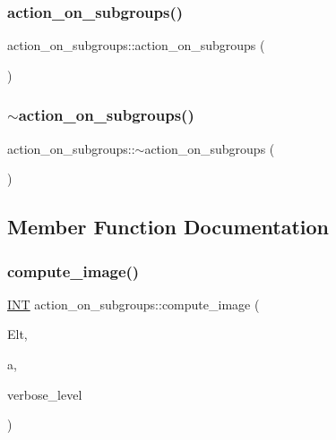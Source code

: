 \subsubsection{\texorpdfstring{action\+\_\+on\+\_\+subgroups()}{action\_on\_subgroups()}}
{\footnotesize\ttfamily action\+\_\+on\+\_\+subgroups\+::action\+\_\+on\+\_\+subgroups (\begin{DoxyParamCaption}{ }\end{DoxyParamCaption})}

\mbox{\label{classaction__on__subgroups_a1f1b28ccbd97e36588893eaf1f58e4a0}} 
\subsubsection{\texorpdfstring{$\sim$action\+\_\+on\+\_\+subgroups()}{~action\_on\_subgroups()}}
{\footnotesize\ttfamily action\+\_\+on\+\_\+subgroups\+::$\sim$action\+\_\+on\+\_\+subgroups (\begin{DoxyParamCaption}{ }\end{DoxyParamCaption})}



\subsection{Member Function Documentation}
\mbox{\label{classaction__on__subgroups_a8d225ed63ea7287aecc5171cb2a49092}} 
\subsubsection{\texorpdfstring{compute\+\_\+image()}{compute\_image()}}
{\footnotesize\ttfamily \mbox{\hyperlink{galois_8h_a09fddde158a3a20bd2dcadb609de11dc}{I\+NT}} action\+\_\+on\+\_\+subgroups\+::compute\+\_\+image (\begin{DoxyParamCaption}\item[{\mbox{\hyperlink{galois_8h_a09fddde158a3a20bd2dcadb609de11dc}{I\+NT}} $\ast$}]{Elt,  }\item[{\mbox{\hyperlink{galois_8h_a09fddde158a3a20bd2dcadb609de11dc}{I\+NT}}}]{a,  }\item[{\mbox{\hyperlink{galois_8h_a09fddde158a3a20bd2dcadb609de11dc}{I\+NT}}}]{verbose\+\_\+level }\end{DoxyParamCaption})}

